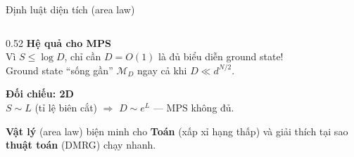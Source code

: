 \documentclass[aspectratio=169, 11pt]{beamer}
\begin{document}
\begin{frame}[fragile, shrink=5]{Định luật diện tích (area law)}
\begin{columns}[T]
\begin{column}{0.52\textwidth}
\vspace{2pt}
\textcolor{qgreen}{\textbf{Hệ quả cho MPS}}\\[2pt]
{\small Vì $S \leq \log D$, chỉ cần $D = O(1)$ là đủ biểu diễn ground state!\\
Ground state ``sống gần'' $\mathcal{M}_D$ ngay cả khi $D \ll d^{N/2}$.}

\vspace{8pt}
\textcolor{qpink}{\textbf{Đối chiếu: 2D}}\\[2pt]
{\small $S \sim L$ (tỉ lệ biên cắt) $\Rightarrow$ $D \sim e^L$ — MPS không đủ.}

\vspace{8pt}
{\small\textcolor{dimtext}{\textbf{Vật lý} (area law) biện minh cho \textbf{Toán} (xấp xỉ hạng thấp) và giải thích tại sao \textbf{thuật toán} (DMRG) chạy nhanh.}}

\end{column}
\end{columns}

\end{frame}
\end{document}
